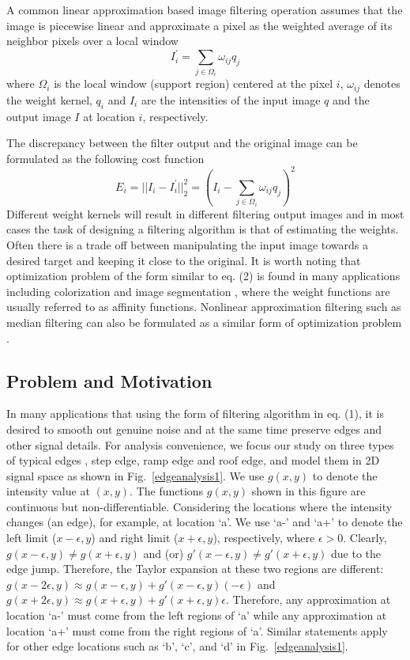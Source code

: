 \documentclass[10pt,twocolumn,letterpaper]{article}
\begin{document}
A common linear approximation based image filtering operation assumes that the image is piecewise linear and approximate a pixel as the weighted average of its neighbor pixels over a local window 
\begin{equation}
I_i^{'}=\sum_{j\in \Omega_i}{\omega_{ij}q_j}
\end{equation}
where $\Omega_i$ is the local window (support region) centered at the pixel $i$, $\omega_{ij}$ denotes the weight kernel, $q_i$ and $I_i$ are the intensities of the input image $q$ and the output image $I$ at location $i$, respectively. 

The discrepancy between the filter output and the original image can be formulated as the following cost function
\begin{equation}
E_i = ||I_i - I_i^{'}||_2^2=(I_i - \sum_{j\in \Omega_i}{\omega_{ij}q_j})^2
\end{equation}
Different weight kernels will result in different filtering output images and in most cases the task of designing a filtering algorithm is that of estimating the weights. Often there is a trade off between manipulating the input image towards a desired target and keeping it close to the original. It is worth noting that optimization problem of the form similar to eq. (2) is found in many applications including colorization \cite{colorization}\cite{colorizationofqiu} and image segmentation \cite{seg1}\cite{seg2}, where the weight functions are usually referred to as affinity functions. Nonlinear approximation filtering such as median filtering can also be formulated as a similar form of optimization problem \cite{med1}. 

\subsection{Problem and Motivation}
In many applications that using the form of filtering algorithm in eq. (1), it is desired to smooth out genuine noise and at the same time preserve edges and other signal details.  For analysis convenience, we focus our study on three types of typical edges \cite{cie}, step edge, ramp edge and roof edge, and model them in 2D signal space as shown in Fig.~\ref{edgeanalysis1}. We use $g(x,y)$ to denote the intensity value at $(x,y)$. The functions $g(x,y)$ shown in this figure are continuous but non-differentiable. Considering the locations where the intensity changes (an edge), for example, at location `a'. We use `a-' and `a+' to denote the left limit ($x-\epsilon,y$) and right limit ($x+\epsilon,y$), respectively, where $\epsilon>0$. Clearly, $g(x-\epsilon,y)\neq g(x+\epsilon,y)$ and (or) $g'(x-\epsilon,y)\neq g'(x+\epsilon,y)$ due to the edge jump. Therefore, the Taylor expansion at these two regions are different: $g(x-2\epsilon,y)\approx g(x-\epsilon,y)+g'(x-\epsilon,y)(-\epsilon)$ and $g(x+2\epsilon,y)\approx g(x+\epsilon,y)+g'(x+\epsilon,y)\epsilon$. Therefore, any approximation at location `a-' must come from the left regions of `a' while any approximation at location `a+' must come from the right regions of `a'. Similar statements apply for other edge locations such as `b', `c', and `d' in Fig.~\ref{edgeanalysis1}.
\end{document}
